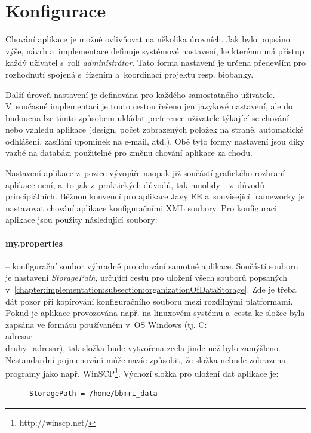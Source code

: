 \documentclass[11pt, draft, oneside]{fithesis2}
\begin{document}
\section{Konfigurace}\label{chapter:implementation:section:configuration}
Chování aplikace je možné ovlivňovat na několika úrovních. Jak bylo popsáno výše, návrh a~implementace definuje systémové nastavení, ke kterému má přístup každý uživatel s~rolí \textit{administrátor}. Tato forma nastavení je určena především pro rozhodnutí spojená s~řízením a~koordinací projektu resp. biobanky. 

Další úroveň nastavení je definována pro každého samostatného uživatele. V~současné implementaci je touto cestou řešeno jen jazykové nastavení, ale do budoucna lze tímto způsobem ukládat preference uživatele týkající se chování nebo vzhledu aplikace (design, počet zobrazených položek na straně, automatické odhlášení, zasílání upomínek na e-mail, atd.).
Obě tyto formy nastavení jsou díky vazbě na databázi použitelné pro změnu chování aplikace za chodu. 

Nastavení aplikace z~pozice vývojáře naopak již součástí grafického rozhraní aplikace není, a~to jak z~praktických důvodů, tak mnohdy i~z~důvodů principiálních. Běžnou konvencí pro aplikace Javy EE a~související frameworky je nastavovat chování aplikace konfiguračními XML soubory. Pro konfiguraci aplikace jsou použity následující soubory:

\paragraph*{my.properties} -- konfigurační soubor výhradně pro chování samotné aplikace. Součástí souboru je nastavení \textit{StoragePath}, určující cestu pro uložení všech souborů popsaných v~\ref{chapter:implementation:subsection:organizationOfDataStorage}. Zde je třeba dát pozor při kopírování konfiguračního souboru mezi rozdílnými platformami. Pokud je aplikace provozována např. na linuxovém systému a~cesta ke složce byla zapsána ve formátu používaném v~OS Windows (tj. C:\\adresar\\druhy\_adresar), tak složka bude vytvořena zcela jinde než bylo zamýšleno. Nestandardní pojmenování může navíc způsobit, že složka nebude zobrazena programy jako např. WinSCP\footnote{http://winscp.net/}. Výchozí složka pro uložení dat aplikace je:

\begin{figure}[h!]
\centering
\begin{BVerbatim}
StoragePath = /home/bbmri_data
\end{BVerbatim}
\end{figure}
\end{document}
